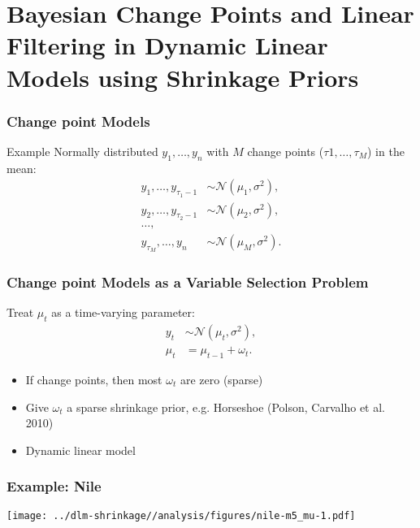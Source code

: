 \documentclass[]{beamer}\usepackage[]{graphicx}\usepackage[]{color}
\begin{document}
\section{Bayesian Change Points and Linear Filtering in Dynamic Linear Models using Shrinkage Priors}

\begin{frame}
  \frametitle{Change point Models}

  \begin{block}{Example}
    Normally distributed $y_{1}, \dots, y_{n}$ with $M$ change points ($\tau{1}, \dots{}, \tau_{M}$) in the mean:
  \begin{align*}
  y_1, \dots{}, y_{\tau_{1} - 1} &\sim \mathcal{N}(\mu_{1}, \sigma^{2}) ,  \\
  y_2, \dots{}, y_{\tau_{2} - 1} &\sim \mathcal{N}(\mu_{2}, \sigma^{2}) , \\
  \dots{},  \\
  y_{\tau_{M}}, \dots{}, y_{n} &\sim \mathcal{N}(\mu_{M}, \sigma^{2}) .
  \end{align*}
  \end{block}

\end{frame}

\begin{frame}
  \frametitle{Change point Models as a Variable Selection Problem}

  Treat $\mu_{t}$ as a time-varying parameter:
  \begin{align*}
    y_{t} &\sim \mathcal{N}(\mu_{t}, \sigma^{2}), \\
    \mu_{t} &= \mu_{t - 1} + \omega_{t}.
  \end{align*}

  \begin{itemize}
  \item If change points, then most $\omega_{t}$ are zero (sparse)
  \item Give $\omega_{t}$ a sparse shrinkage prior, e.g. Horseshoe (Polson, Carvalho et al. 2010)
  \item Dynamic linear model
  \end{itemize}
  
\end{frame}

\begin{frame}
  \frametitle{Example: Nile}
  \texttt{[image: ../dlm-shrinkage//analysis/figures/nile-m5\_mu-1.pdf]}
\end{frame}
\end{document}
